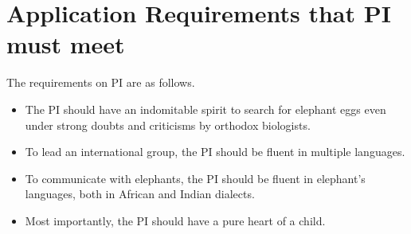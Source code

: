 \documentclass[11pt,a4paper,dvipdfmx]{article} 		%
\newcommand{\研究課題名}{象の卵}
\newcommand{\研究機関名}{逢坂大学}
\newcommand{\研究代表者氏名}{湯川秀樹}
\begin{document}

\section{Application Requirements that PI must meet 
}

\JSPSInstructions	%

	The requirements on PI are as follows.
	\begin{itemize}
		\item The PI should have an indomitable spirit to
			search for elephant eggs even under strong 
			doubts and criticisms by orthodox biologists. 
		\item To lead an international group, the PI should be
			fluent in multiple languages.
		\item To communicate with elephants, the PI should be
			fluent in elephant's languages, both 
			in African and Indian dialects.
		\item Most importantly, the PI should have a pure heart of a child.
	\end{itemize}
	
	









%
%


\end{document}
